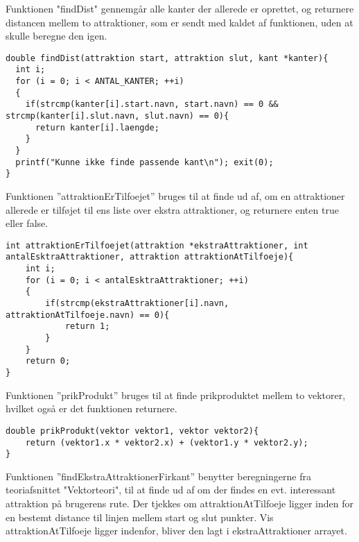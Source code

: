 Funktionen "findDist" gennemgår alle kanter der allerede er oprettet, og returnere distancen mellem to attraktioner, som er sendt med kaldet af funktionen, uden at skulle beregne den igen. \newline

\begin{lstlisting}
double findDist(attraktion start, attraktion slut, kant *kanter){
  int i;
  for (i = 0; i < ANTAL_KANTER; ++i)
  {
    if(strcmp(kanter[i].start.navn, start.navn) == 0 && strcmp(kanter[i].slut.navn, slut.navn) == 0){
      return kanter[i].laengde;
    }
  }
  printf("Kunne ikke finde passende kant\n"); exit(0);
}
\end{lstlisting}

Funktionen ”attraktionErTilfoejet” bruges til at finde ud af, om en attraktioner allerede er tilføjet til ens liste over ekstra attraktioner, og returnere enten true eller false. \newline

\begin{lstlisting}
int attraktionErTilfoejet(attraktion *ekstraAttraktioner, int antalEsktraAttraktioner, attraktion attraktionAtTilfoeje){
	int i;
	for (i = 0; i < antalEsktraAttraktioner; ++i)
	{
		if(strcmp(ekstraAttraktioner[i].navn, attraktionAtTilfoeje.navn) == 0){
			return 1;
		}
	}
	return 0;
}
\end{lstlisting}

Funktionen ”prikProdukt” bruges til at finde prikproduktet mellem to vektorer, hvilket også er det funktionen returnere. \newline

\begin{lstlisting}
double prikProdukt(vektor vektor1, vektor vektor2){
	return (vektor1.x * vektor2.x) + (vektor1.y * vektor2.y);
}
\end{lstlisting}

Funktionen ”findEkstraAttraktionerFirkant” benytter beregningerne fra teoriafsnittet "Vektorteori", til at finde ud af om der findes en evt. interessant attraktion på brugerens rute. Der tjekkes om attraktionAtTilfoeje ligger inden for en bestemt distance til linjen mellem start og slut punkter. Vis attraktionAtTilfoeje ligger indenfor, bliver den lagt i ekstraAttraktioner arrayet. \newline

